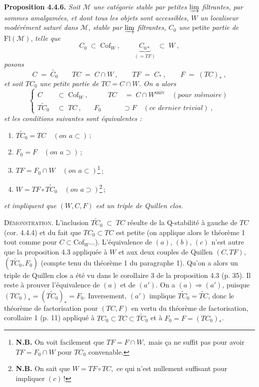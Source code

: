 \documentclass[11pt]{article}
\newcommand{\printedpage}[1]{\marginpar{\footnotesize p.~#1}}
\newcommand{\msp}[1]{\marginpar{\footnotesize [#1]}}
\newcommand{\Fl}{\mathrm{Fl}}
\newcommand{\Cof}{\mathrm{Cof}}
\newcommand{\univ}{\mathrm{univ}}
\begin{document}
\textbf{Proposition 4.4.6.} \textit{Soit $\mathcal{M}$ une catégorie stable par petites $\varinjlim$ filtrantes, par sommes amalgamées, et dont tous les objets sont accessibles, $W$ un localiseur}
\msp{page 42}
\textit{modérément saturé dans $\mathcal{M}$, stable par $\varinjlim$ filtrantes, $C_0$ une} petite \textit{partie de} $\Fl(\mathcal{M})$, \textit{telle que}
\[
C_0\;\subset\;\Cof_W\ ,\qquad \underbrace{C_{0*}}_{(=TF)}\;\subset\;W\ ,
\]
\printedpage{28}
\textit{posons}
\[
C\;=\;\widetilde{C_0}\qquad TC\;=\;C\cap W\ ,\qquad TF\;=\;C_*\ ,\qquad F\;=\;(TC)_*\ ,
\]
\textit{et soit $TC_0$ une petite partie de $TC=C\cap W$. On a alors}
\[
\left\{
\begin{aligned}
C &\;\subset\;\Cof_W\ , &\qquad TC &\;=\;C\cap W^{\univ}\quad(\textit{pour mémoire})\\
\widetilde{TC_0} &\;\subset\;TC\ , & F_0 &\supset F\quad(\textit{ce dernier trivial})\ ,
\end{aligned}
\right.
\tag*{(4.4.6)}
\]
\textit{et les conditions suivantes sont équivalentes :}
\begin{enumerate}[leftmargin=*]
\item[a)] $\widetilde{TC_0}=TC\quad(\textit{on a}\subset)$\,;
\item[a$'$)] $F_0=F\quad(\textit{on a}\supset)$\,;
\item[b)] $TF=F_0\cap W\quad(\textit{on a}\subset)$\footnote[14]{\textbf{N.B.} On voit facilement que $\boxed{TF=F\cap W,}$ mais ça ne suffit pas pour avoir $TF=F_0\cap W$ pour $TC_0$ convenable.}\,;
\item[c)] $W=TF\circ\widetilde{TC_0}\quad(\textit{on a}\supset)$\footnote[15]{\textbf{N.B.} On sait que $\boxed{W=TF\circ TC,}$ ce qui n'est nullement suffisant pour impliquer $(c)$\,!}\,;
\end{enumerate}
\textit{et impliquent que $(W,C,F)$ est un triple de Quillen clos.}

\textsc{Démonstration.} L'inclusion $\widetilde{TC_0}\;\subset\;TC$ résulte de la Q-stabilité à gauche de $TC$ (cor. 4.4.4) et du fait que $TC_0\subset TC$ est petite (on applique alors le théorème 1 tout comme pour $C\subset\Cof_W\ldots$). L'équivalence de $(a)$, $(b)$, $(c)$ n'est autre que la proposition 4.3 appliquée à $W$ et aux deux couples de Quillen $(C,TF)$, $(\widetilde{TC_0},F_0)$ (compte tenu du théorème 1 du paragraphe 1). Qu'on a alors un triple de Quillen clos a été vu dans le corollaire 3 de la proposition 4.3 (p. 35). Il reste à prouver l'équivalence de $(a)$ et de $(a')$. On a $(a)\Longrightarrow(a')$, puisque $(TC_0)_*=(\widetilde{TC_0})_*=F_0$. Inversement, $(a')$ implique $\widetilde{TC_0}=\widetilde{TC}$, donc le théorème de factorisation pour $(TC,F)$ en vertu du théorème de factorisation, corollaire 1 (p. 11) appliqué à $TC_0\subset TC\subset\widetilde{TC_0}$ et à $F_0=F=(TC_0)_*$.
\end{document}
